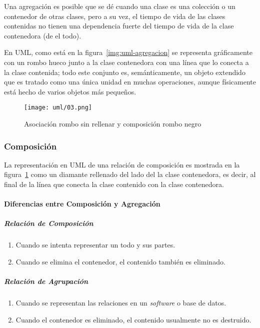 Una agregación es posible que se dé cuando una clase es una colección o un contenedor de otras clases, pero a su vez, el tiempo de vida de las clases contenidas no tienen una dependencia fuerte del tiempo de vida de la clase contenedora (de el todo). 


En UML, como está en la figura~\ref{img:uml-agregacion} se representa gráficamente con un rombo hueco junto a la clase contenedora con una línea que lo conecta a la clase contenida; todo este conjunto es, semánticamente, un objeto extendido que es tratado como una única unidad en muchas operaciones, aunque físicamente está hecho de varios objetos más pequeños.

\begin{figure}[H] 
    \centering
    \texttt{[image: uml/03.png]}
    \caption{Asociación rombo sin rellenar y composición rombo negro}
    \label{img:uml-composicion}
\end{figure}

\subsubsection*{Composición}

La representación en UML de una relación de composición es mostrada en la figura~\ref{img:uml-composicion} como un diamante rellenado del lado del la clase contenedora, es decir, al final de la línea que conecta la clase contenido con la clase contenedora.


\paragraph*{Diferencias entre Composición y Agregación}

\subparagraph*{Relación de Composición}

\begin{enumerate}
    \item Cuando se intenta representar un todo y sus partes.
    \item Cuando se elimina el contenedor, el contenido también es eliminado.
\end{enumerate}


\subparagraph*{Relación de Agrupación}

\begin{enumerate}
    \item Cuando se representan las relaciones en un \textit{software} o base de datos. 
    \item Cuando el contenedor es eliminado, el contenido usualmente no es destruido.
\end{enumerate}